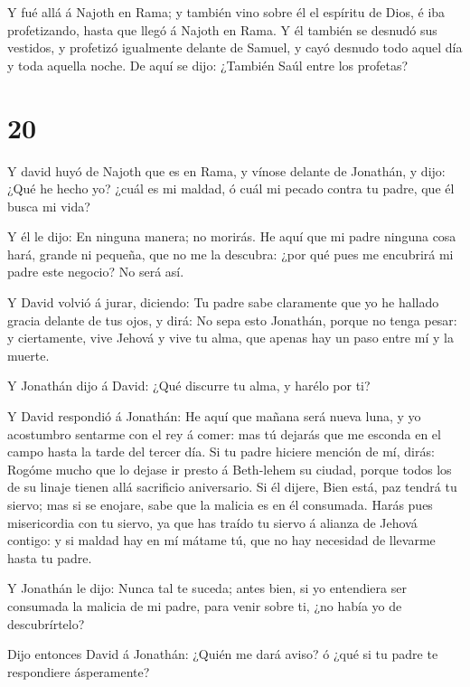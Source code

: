 Y fué allá á Najoth en Rama; y también vino sobre él el
espíritu de Dios, é iba profetizando, hasta que llegó á Najoth en Rama.
 Y él también se desnudó sus vestidos, y profetizó
igualmente delante de Samuel, y cayó desnudo todo aquel día y toda
aquella noche. De aquí se dijo: ¿También Saúl entre los profetas?

\hypertarget{section-19}{%
\section{20}\label{section-19}}

 Y david huyó de Najoth que es en Rama, y vínose delante de
Jonathán, y dijo: ¿Qué he hecho yo? ¿cuál es mi maldad, ó cuál mi pecado
contra tu padre, que él busca mi vida?

 Y él le dijo: En ninguna manera; no morirás. He aquí que mi
padre ninguna cosa hará, grande ni pequeña, que no me la descubra: ¿por
qué pues me encubrirá mi padre este negocio? No será así.

 Y David volvió á jurar, diciendo: Tu padre sabe claramente
que yo he hallado gracia delante de tus ojos, y dirá: No sepa esto
Jonathán, porque no tenga pesar: y ciertamente, vive Jehová y vive tu
alma, que apenas hay un paso entre mí y la muerte.

 Y Jonathán dijo á David: ¿Qué discurre tu alma, y harélo
por ti?

 Y David respondió á Jonathán: He aquí que mañana será nueva
luna, y yo acostumbro sentarme con el rey á comer: mas tú dejarás que me
esconda en el campo hasta la tarde del tercer día.  Si tu
padre hiciere mención de mí, dirás: Rogóme mucho que lo dejase ir presto
á Beth-lehem su ciudad, porque todos los de su linaje tienen allá
sacrificio aniversario.  Si él dijere, Bien está, paz tendrá
tu siervo; mas si se enojare, sabe que la malicia es en él consumada.
 Harás pues misericordia con tu siervo, ya que has traído tu
siervo á alianza de Jehová contigo: y si maldad hay en mí mátame tú, que
no hay necesidad de llevarme hasta tu padre.

 Y Jonathán le dijo: Nunca tal te suceda; antes bien, si yo
entendiera ser consumada la malicia de mi padre, para venir sobre ti,
¿no había yo de descubrírtelo?

 Dijo entonces David á Jonathán: ¿Quién me dará aviso? ó
¿qué si tu padre te respondiere ásperamente?

